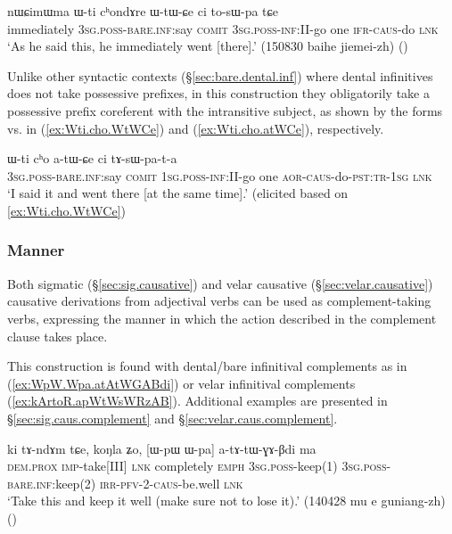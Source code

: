 \begin{exe} 
\ex \label{ex:Wti.cho.WtWCe}  
\gll  nɯɕimɯma ɯ-ti cʰondɤre ɯ-tɯ-ɕe ci to-sɯ-pa tɕe \\
immediately \textsc{3sg}.\textsc{poss}-\textsc{bare}.\textsc{inf}:say \textsc{comit} \textsc{3sg}.\textsc{poss}-\textsc{inf}:\textsc{II}-go  one \textsc{ifr}-\textsc{caus}-do \textsc{lnk} \\
\glt `As he said this, he immediately went [there].' (150830 baihe jiemei-zh)
()
\end{exe} 

Unlike other syntactic contexts (§\ref{sec:bare.dental.inf}) where dental infinitives does not take possessive prefixes, in this construction they obligatorily take a possessive prefix coreferent with the intransitive subject, as shown by the forms  vs.  in (\ref{ex:Wti.cho.WtWCe}) and (\ref{ex:Wti.cho.atWCe}), respectively.

\begin{exe} 
\ex \label{ex:Wti.cho.atWCe}
\gll   ɯ-ti cʰo a-tɯ-ɕe ci tɤ-sɯ-pa-t-a  \\
\textsc{3sg}.\textsc{poss}-\textsc{bare}.\textsc{inf}:say \textsc{comit} \textsc{1sg}.\textsc{poss}-\textsc{inf}:\textsc{II}-go  one  \textsc{aor}-\textsc{caus}-do-\textsc{pst}:\textsc{tr}-\textsc{1sg} \textsc{lnk} \\
\glt `I said it and went there [at the same time].' (elicited based on \ref{ex:Wti.cho.WtWCe})
\end{exe} 

\subsubsection{Manner} \label{sec:causative.manner.complement}
Both sigmatic (§\ref{sec:sig.causative}) and velar causative (§\ref{sec:velar.causative}) causative derivations from adjectival verbs can be used as complement-taking verbs, expressing the manner in which the action described in the complement clause takes place.


This construction is found with dental/bare infinitival complements as in (\ref{ex:WpW.Wpa.atAtWGABdi}) or velar infinitival complements (\ref{ex:kArtoR.apWtWsWRzAB}). Additional examples are presented in §\ref{sec:sig.caus.complement} and §\ref{sec:velar.caus.complement}. 

\begin{exe} 
\ex \label{ex:WpW.Wpa.atAtWGABdi}
\gll ki tɤ-ndɤm tɕe, koŋla ʑo, [ɯ-pɯ ɯ-pa] a-tɤ-tɯ-ɣɤ-βdi ma  \\
\textsc{dem}.\textsc{prox} \textsc{imp}-take[III] \textsc{lnk} completely \textsc{emph} \textsc{3sg}.\textsc{poss}-keep(1) \textsc{3sg}.\textsc{poss}-\textsc{bare}.\textsc{inf}:keep(2) \textsc{irr}-\textsc{pfv}-2-\textsc{caus}-be.well \textsc{lnk} \\
\glt `Take this and keep it well (make sure not to lose it).' (140428 mu e guniang-zh)
()
\end{exe} 

